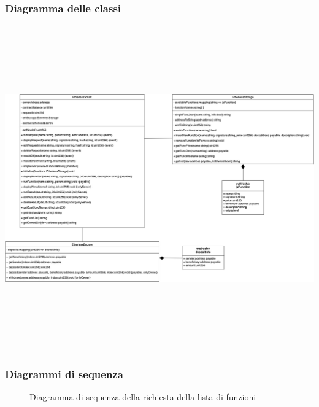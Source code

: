 \begin{landscape}
\subsubsection{Diagramma delle classi}
  \includegraphics[width=21.5cm, height=14cm]{././diagrammi/etherless-smart/classi/Etherless-smart.jpg}
\end{landscape}
\restoregeometry
\subsubsection{Diagrammi di sequenza}
\begin{figure}[H]
	\noindent
	\caption{Diagramma di sequenza della richiesta della lista di funzioni}
\end{figure}


